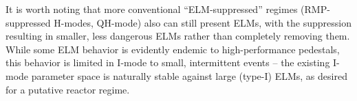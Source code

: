 It is worth noting that more conventional ``ELM-suppressed'' regimes (\eg RMP-suppressed H-modes, QH-mode) also can still present ELMs, with the suppression resulting in smaller, less dangerous ELMs rather than completely removing them.  While some ELM behavior is evidently endemic to high-performance pedestals, this behavior is limited in I-mode to small, intermittent events -- the existing I-mode parameter space is naturally stable against large (type-I) ELMs, as desired for a putative reactor regime.\nicechapterending


